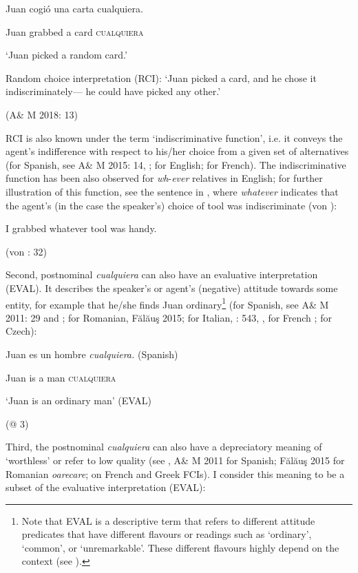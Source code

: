 \documentclass[output=paper]{langscibook}
\begin{document}
    Juan cogió  una  carta  cualquiera.

    Juan grabbed  a  card  \textsc{cualquiera}

    ‘Juan picked a random card.’

    Random choice interpretation (RCI): ‘Juan picked a card, and he chose it indiscriminately— he could have picked any other.’

    (A\& M 2018: 13)

RCI is also known under the term ‘indiscriminative function’, i.e. it conveys the agent’s indifference with respect to his/her choice from a given set of alternatives (for Spanish, see A\& M 2015: 14, \citealt{Horn2000}; for English; \citealt{Vlachou2007,Vlachou2012} for French). The indiscriminative function has been also observed for \textit{wh}{}-\textit{ever} relatives in English; for further illustration of this function, see the sentence in , where \textit{whatever} indicates that the agent’s (in the case the speaker’s) choice of tool was indiscriminate (von \citealt{Fintel2000}):

    I grabbed whatever tool was handy.   

      (von \citealt{Fintel2000}: 32)

Second, postnominal \textit{cualquiera} can also have an evaluative interpretation (EVAL). It describes the speaker’s or agent’s (negative) attitude towards some entity, for example that he/she finds Juan ordinary\footnote{\textrm{Note that EVAL is a descriptive term that refers to different attitude predicates that have different flavours or readings such as ‘ordinary’, ‘common’, or ‘unremarkable’. These different flavours highly depend on the context (see ).}} (for Spanish, see A\& M 2011: 29 and \citealt{Rivero2011}; for Romanian, Fălăuş 2015; for Italian, \citealt{Chierchia2006}: 543, \citealt{Kellert2021}, for French \citealt{Vlachou2007,Vlachou2012}; \citealt{Šimík2008} for Czech):\textstyleFootnoteSymbol{} 

    Juan  es  un  hombre  \textit{cualquiera.}  (Spanish)

    Juan  is  a  man  \textsc{cualquiera}  

    ‘Juan is an ordinary man’ (EVAL)

    (@ 3)

Third, the postnominal \textit{cualquiera} can also have a depreciatory meaning of ‘worthless’ or refer to low quality (see \citealt{Rivero2011}, A\& M 2011 for Spanish; Fălăuş 2015 for Romanian \textit{oarecare}; \citealt{Vlachou2007,Vlachou2012} on French and Greek FCIs). I consider this meaning to be a subset of the evaluative interpretation (EVAL):
\end{document}
